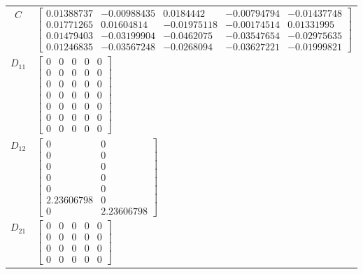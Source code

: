 \begin{tabular}{cl}
   $C$    & $\left[\begin{matrix}0.01388737 & -0.00988435 & 0.0184442 & -0.00794794 & -0.01437748\\0.01771265 & 0.01604814 & -0.01975118 & -0.00174514 & 0.01331995\\0.01479403 & -0.03199904 & -0.0462075 & -0.03547654 & -0.02975635\\0.01246835 & -0.03567248 & -0.0268094 & -0.03627221 & -0.01999821\end{matrix}\right]$                                                                        \\
 $D_{11}$ & $\left[\begin{matrix}0 & 0 & 0 & 0 & 0\\0 & 0 & 0 & 0 & 0\\0 & 0 & 0 & 0 & 0\\0 & 0 & 0 & 0 & 0\\0 & 0 & 0 & 0 & 0\\0 & 0 & 0 & 0 & 0\\0 & 0 & 0 & 0 & 0\end{matrix}\right]$                                                                                                                                                                                                             \\
 $D_{12}$ & $\left[\begin{matrix}0 & 0\\0 & 0\\0 & 0\\0 & 0\\0 & 0\\2.23606798 & 0\\0 & 2.23606798\end{matrix}\right]$                                                                                                                                                                                                                                                                               \\
 $D_{21}$ & $\left[\begin{matrix}0 & 0 & 0 & 0 & 0\\0 & 0 & 0 & 0 & 0\\0 & 0 & 0 & 0 & 0\\0 & 0 & 0 & 0 & 0\end{matrix}\right]$                                                                                                                                                                                                                                                                      \\
\hline
\end{tabular}
